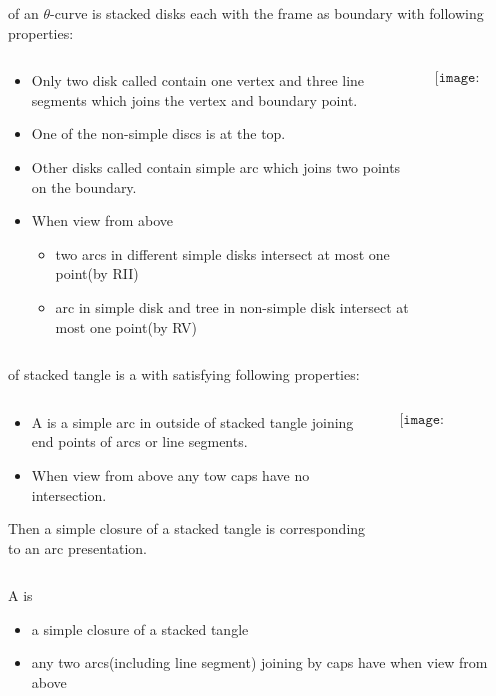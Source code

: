\begin{frame}
	 of an $\theta$-curve is stacked disks each with the frame as boundary with following properties:
	\begin{columns}
		\begin{column}{0.8\textwidth}
			\begin{itemize}
				\item Only two disk called  contain one vertex and three line segments which joins the vertex and boundary point.
				\item One of the non-simple discs is at the top.
				\item Other disks called  contain simple arc which joins two points on the boundary.
				\item When view from above
				\begin{itemize}
					\item two arcs in different simple disks intersect at most one point(by RII)
					\item arc in simple disk and tree in non-simple disk intersect at most one point(by RV)
				\end{itemize}
			\end{itemize}
		\end{column}

		\begin{column}{0.2\textwidth}
			$$\texttt{[image: stacked.png]}$$
		\end{column}
	\end{columns}
\end{frame}


\begin{frame}
	 of stacked tangle is a  with  satisfying following properties:
	\vspace*{-10pt}
	\begin{columns}
		\begin{column}{.8\textwidth}
			\begin{itemize}
				\item A  is a simple arc in outside of stacked tangle joining end points of arcs or line segments.
				\item When view from above any tow caps have no intersection.
			\end{itemize}					
			Then a simple closure of a stacked tangle  is corresponding to an arc presentation.
		\end{column}

	\begin{column}{.2\textwidth}
		$$\texttt{[image: stacked\_theta.png]}$$
	\end{column}
	\end{columns}
	A  is 
	\begin{itemize}
		\item a simple closure of a stacked tangle 
		\item any two arcs(including line segment) joining by caps have  when view from above
	\end{itemize}
\end{frame}


